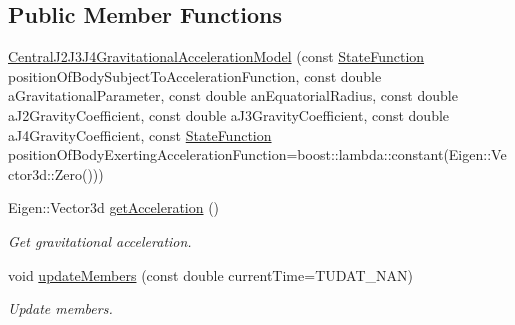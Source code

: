 \subsection*{Public Member Functions}
\begin{DoxyCompactItemize}
\item 
\hyperlink{classtudat_1_1gravitation_1_1CentralJ2J3J4GravitationalAccelerationModel_ae9c15c261561bc55dcc44c71d265881a}{Central\+J2\+J3\+J4\+Gravitational\+Acceleration\+Model} (const \hyperlink{classtudat_1_1gravitation_1_1SphericalHarmonicsGravitationalAccelerationModelBase_a4ca706c4f941be481fc5f490e49390d8}{State\+Function} position\+Of\+Body\+Subject\+To\+Acceleration\+Function, const double a\+Gravitational\+Parameter, const double an\+Equatorial\+Radius, const double a\+J2\+Gravity\+Coefficient, const double a\+J3\+Gravity\+Coefficient, const double a\+J4\+Gravity\+Coefficient, const \hyperlink{classtudat_1_1gravitation_1_1SphericalHarmonicsGravitationalAccelerationModelBase_a4ca706c4f941be481fc5f490e49390d8}{State\+Function} position\+Of\+Body\+Exerting\+Acceleration\+Function=boost\+::lambda\+::constant(Eigen\+::\+Vector3d\+::\+Zero()))
\item 
Eigen\+::\+Vector3d \hyperlink{classtudat_1_1gravitation_1_1CentralJ2J3J4GravitationalAccelerationModel_a5a8e57485fff4546caec93841a947406}{get\+Acceleration} ()
\begin{DoxyCompactList}\small\item\em Get gravitational acceleration. \end{DoxyCompactList}\item 
void \hyperlink{classtudat_1_1gravitation_1_1CentralJ2J3J4GravitationalAccelerationModel_a8cdbef1b4414bf04628e603907aaae1c}{update\+Members} (const double current\+Time=T\+U\+D\+A\+T\+\_\+\+N\+AN)
\begin{DoxyCompactList}\small\item\em Update members. \end{DoxyCompactList}\end{DoxyCompactItemize}
